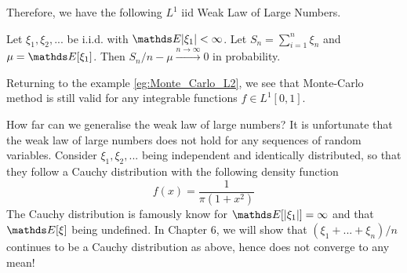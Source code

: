 \begin{unexaminable}
Therefore, we have the following $L^1$ iid Weak Law of Large Numbers.
\begin{theorem} \label{thm:WLLN1}
Let $\xi_1, \xi_2, ...$ be i.i.d. with $\E|\xi_1|<\infty$. Let $S_n = \sum_{i=1}^n \xi_n$ and $\mu = \E[\xi_1]$. Then $S_n/n - \mu \overset{n\to\infty}\to 0$ in probability.
\end{theorem}

\begin{example}
Returning to the example \ref{eg:Monte_Carlo_L2}, we see that Monte-Carlo method is still valid for any integrable functions $f \in L^1[0,1]$.
\end{example}

\begin{remark}
How far can we generalise the weak law of large numbers? It is unfortunate that the weak law of large numbers does not hold for any sequences of random variables. Consider $\xi_1, \xi_2, ...$ being independent and identically distributed, so that they follow a Cauchy distribution with the following density function
\begin{equation}
f(x) = \frac{1}{\pi(1+x^2)}
\end{equation}
The Cauchy distribution is famously know for $\E[|\xi_1|] = \infty$ and that $\E[\xi]$ being undefined. In Chapter 6, we will show that $(\xi_1 + ... + \xi_n)/n$ continues to be a Cauchy distribution as above, hence does not converge to any mean!
\end{remark}


\end{unexaminable}
